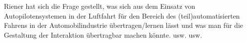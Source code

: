 Riener \cite{riener} hat sich die Frage gestellt, was sich aus dem Einsatz von Autopilotensystemen in der Luftfahrt für den Bereich des (teil)automatisierten Fahrens in der Automobilindustrie übertragen/lernen lässt und was man für die Gestaltung der Interaktion übertragbar machen könnte. usw. usw.
